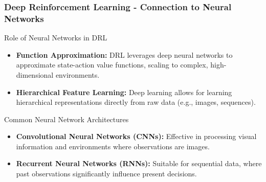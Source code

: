 \documentclass[aspectratio=169]{beamer}
\begin{document}
\begin{frame}[fragile]
    \frametitle{Deep Reinforcement Learning - Connection to Neural Networks}
    \begin{block}{Role of Neural Networks in DRL}
        \begin{itemize}
            \item \textbf{Function Approximation:} DRL leverages deep neural networks to approximate state-action value functions, scaling to complex, high-dimensional environments.
            \item \textbf{Hierarchical Feature Learning:} Deep learning allows for learning hierarchical representations directly from raw data (e.g., images, sequences).
        \end{itemize}
    \end{block}

    \begin{block}{Common Neural Network Architectures}
        \begin{itemize}
            \item \textbf{Convolutional Neural Networks (CNNs):} Effective in processing visual information and environments where observations are images.
            \item \textbf{Recurrent Neural Networks (RNNs):} Suitable for sequential data, where past observations significantly influence present decisions.
        \end{itemize}
    \end{block}
\end{frame}
\end{document}
